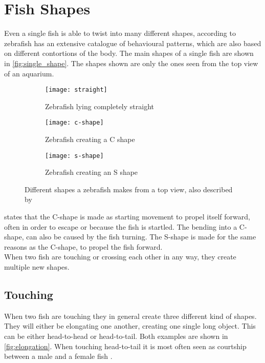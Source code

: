 \section{Fish Shapes}
Even a single fish is able to twist into many different shapes, according to \cite{Kalueff2013} zebrafish has an extensive catalogue of behavioural patterns, which are also based on different contortions of the body. The main shapes of a single fish are shown in \autoref{fig:single_shape}. The shapes shown are only the ones seen from the top view of an aquarium.

\begin{figure}[H]
	\centering
	\begin{subfigure}[b]{0.3\textwidth}
		\texttt{[image: straight]}
		\caption{Zebrafish lying completely straight}
		\label{fig:straight_fish}
	\end{subfigure}
	\begin{subfigure}[b]{0.3\textwidth}
		\texttt{[image: c-shape]}
		\caption{Zebrafish creating a C shape}
		\label{fig:c-shape_fish}
	\end{subfigure}
	\begin{subfigure}[b]{0.3\textwidth}
		\texttt{[image: s-shape]}
		\caption{Zebrafish creating an S shape}
		\label{fig:s-shape_fish}
	\end{subfigure}
\caption{Different shapes a zebrafish makes from a top view, also described by \cite{Kalueff2013}}
\label{fig:single_shape}
\end{figure}

\cite{Kalueff2013} states that the C-shape is made as starting movement to propel itself forward, often in order to escape or because the fish is startled. The bending into a C-shape, can also be caused by the fish turning. The S-shape is made for the same reasons as the C-shape, to propel the fish forward.\\

When two fish are touching or crossing each other in any way, they create multiple new shapes.

\subsection{Touching}
When two fish are touching they in general create three different kind of shapes. They will either be elongating one another, creating one single long object. This can be either head-to-head or head-to-tail. Both examples are shown in \autoref{fig:elongation}. When touching head-to-tail it is most often seen as courtship between a male and a female fish \citep{Kalueff2013}.

